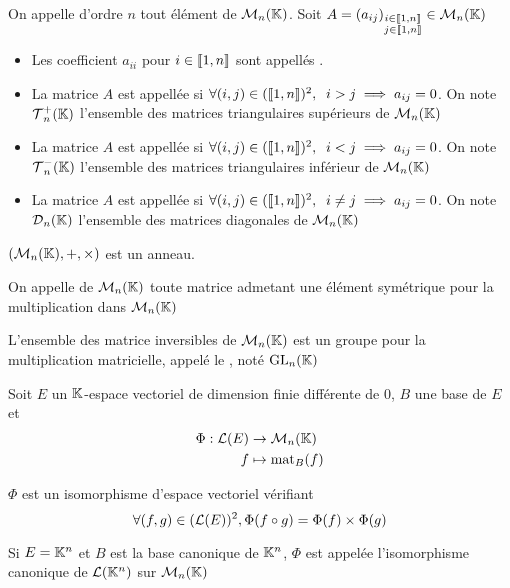 \begin{dfn}
On appelle  d'ordre $n$ tout élément de $\operatorname{\mathcal{M}}_n(\mathbb{K})$.
Soit $A = (a_{ij})_{
    \substack {i \in \llbracket 1, n \rrbracket \\ j \in \llbracket 1, n \rrbracket}} 
    \in \operatorname{\mathcal{M}}_n(\mathbb{K})$

\begin{itemize}
    \item Les coefficient $a_{ii}$ pour $i \in \llbracket 1, n \rrbracket$ sont
    appellés .
    \item La matrice $A$ est appellée 
    si $\forall (i, j) \in (\llbracket 1, n \rrbracket)^2, \;\; i > j \implies 
    a_{ij} = 0$. On note $\operatorname{\mathcal{T}}^+_n(\mathbb{K})$ l'ensemble des matrices
    triangulaires supérieurs de $\operatorname{\mathcal{M}}_n(\mathbb{K})$
    \item La matrice $A$ est appellée 
    si $\forall (i, j) \in (\llbracket 1, n \rrbracket)^2, \;\; i < j \implies 
    a_{ij} = 0$. On note $\operatorname{\mathcal{T}}^-_n(\mathbb{K})$ l'ensemble des matrices
    triangulaires inférieur de $\operatorname{\mathcal{M}}_n(\mathbb{K})$
    \item La matrice $A$ est appellée 
    si $\forall (i, j) \in (\llbracket 1, n \rrbracket)^2, \;\; i \neq j \implies 
    a_{ij} = 0$. On note $\operatorname{\mathcal{D}}_n(\mathbb{K})$ l'ensemble des matrices diagonales de
    $\operatorname{\mathcal{M}}_n(\mathbb{K})$
\end{itemize}
\end{dfn}

\begin{prp}
$(\operatorname{\mathcal{M}}_n(\mathbb{K}), +, \times)$ est un anneau.
\end{prp}

\begin{dfn}
On appelle  de $\operatorname{\mathcal{M}}_n(\mathbb{K})$ toute matrice
admetant une élément symétrique pour la multiplication dans
$\operatorname{\mathcal{M}}_n(\mathbb{K})$

L'ensemble des matrice inversibles de $\operatorname{\mathcal{M}}_n(\mathbb{K})$ est un groupe pour la
multiplication matricielle, appelé le ,
noté $\mathrm{GL}_n(\mathbb{K})$
\end{dfn}

\begin{prp}
Soit $E$ un $\mathbb{K}$-espace vectoriel de dimension finie différente de $0$,
$B$ une base de $E$ et
\begin{align*}
    \Phi : \operatorname{\mathcal{L}}(E) &\to \operatorname{\mathcal{M}}_n(\mathbb{K}) \\
        f &\mapsto \operatorname{mat}_B(f)
\end{align*}

$\Phi$ est un isomorphisme d'espace vectoriel vérifiant
\[
    \forall (f, g) \in (\operatorname{\mathcal{L}}(E))^2, \Phi(f \circ g) =
    \Phi(f) \times \Phi(g)
\]

Si $E = \mathbb{K}^n$ et $B$ est la base canonique de $\mathbb{K}^n$, $\Phi$ est appelée
l'isomorphisme canonique de $\operatorname{\mathcal{L}}(\mathbb{K}^n)$ sur $\operatorname{\mathcal{M}}_n(\mathbb{K})$
\end{prp}

